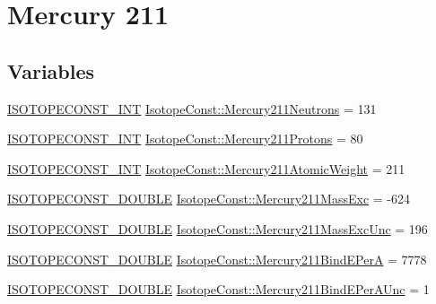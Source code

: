 \hypertarget{group___isotope_const-_mercury-_hg211}{}\section{Mercury 211}
\label{group___isotope_const-_mercury-_hg211}
\subsection*{Variables}
\begin{DoxyCompactItemize}
\item 
\mbox{\hyperlink{group___isotope_const-_macros_ga5f18360b3e99483a35c32d789e62621c}{I\+S\+O\+T\+O\+P\+E\+C\+O\+N\+S\+T\+\_\+\+I\+NT}} \mbox{\hyperlink{group___isotope_const-_mercury-_hg211_ga2bfdcd700119159cb37035f6fdf00fdb}{Isotope\+Const\+::\+Mercury211\+Neutrons}} = 131
\item 
\mbox{\hyperlink{group___isotope_const-_macros_ga5f18360b3e99483a35c32d789e62621c}{I\+S\+O\+T\+O\+P\+E\+C\+O\+N\+S\+T\+\_\+\+I\+NT}} \mbox{\hyperlink{group___isotope_const-_mercury-_hg211_ga94698216f4c1d347737ac8ff7d3c570c}{Isotope\+Const\+::\+Mercury211\+Protons}} = 80
\item 
\mbox{\hyperlink{group___isotope_const-_macros_ga5f18360b3e99483a35c32d789e62621c}{I\+S\+O\+T\+O\+P\+E\+C\+O\+N\+S\+T\+\_\+\+I\+NT}} \mbox{\hyperlink{group___isotope_const-_mercury-_hg211_gae3970fe8888c022fca28853e72278785}{Isotope\+Const\+::\+Mercury211\+Atomic\+Weight}} = 211
\item 
\mbox{\hyperlink{group___isotope_const-_macros_ga8f45a7272ce02c0b4c65c44636ed719a}{I\+S\+O\+T\+O\+P\+E\+C\+O\+N\+S\+T\+\_\+\+D\+O\+U\+B\+LE}} \mbox{\hyperlink{group___isotope_const-_mercury-_hg211_gad26f773412f67e03adbcc51649f78b9a}{Isotope\+Const\+::\+Mercury211\+Mass\+Exc}} = -\/624
\item 
\mbox{\hyperlink{group___isotope_const-_macros_ga8f45a7272ce02c0b4c65c44636ed719a}{I\+S\+O\+T\+O\+P\+E\+C\+O\+N\+S\+T\+\_\+\+D\+O\+U\+B\+LE}} \mbox{\hyperlink{group___isotope_const-_mercury-_hg211_ga3f533edc3bb0cbd0b97fa7a743a0e176}{Isotope\+Const\+::\+Mercury211\+Mass\+Exc\+Unc}} = 196
\item 
\mbox{\hyperlink{group___isotope_const-_macros_ga8f45a7272ce02c0b4c65c44636ed719a}{I\+S\+O\+T\+O\+P\+E\+C\+O\+N\+S\+T\+\_\+\+D\+O\+U\+B\+LE}} \mbox{\hyperlink{group___isotope_const-_mercury-_hg211_gac70c55f4dee7b053836eee56893147ee}{Isotope\+Const\+::\+Mercury211\+Bind\+E\+PerA}} = 7778
\item 
\mbox{\hyperlink{group___isotope_const-_macros_ga8f45a7272ce02c0b4c65c44636ed719a}{I\+S\+O\+T\+O\+P\+E\+C\+O\+N\+S\+T\+\_\+\+D\+O\+U\+B\+LE}} \mbox{\hyperlink{group___isotope_const-_mercury-_hg211_ga3bfb934d95f94b59917bdf0bd13cffc8}{Isotope\+Const\+::\+Mercury211\+Bind\+E\+Per\+A\+Unc}} = 1

\end{DoxyCompactItemize}
